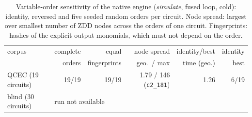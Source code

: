\begin{table}[t]
\centering\footnotesize
\caption{Variable-order sensitivity of the native engine (\emph{simulate}, fused loop, cold): identity, reversed and five seeded random orders per circuit. Node spread: largest over smallest number of ZDD nodes across the orders of one circuit. Fingerprints: hashes of the explicit output monomials, which must not depend on the order.}
\label{tab:order}
\begin{tabular}{lrrrrr}
\toprule
corpus & complete & equal & node spread & identity/best & identity \\
 & orders & fingerprints & geo.\ / max & time (geo.) & best \\
\midrule
QCEC (19 circuits) & 19/19 & 19/19 & 1.79 / 146 (\texttt{c2\_181}) & 1.26 & 6/19 \\
blind (30 circuits) & \multicolumn{5}{l}{run not available} \\
\bottomrule
\end{tabular}
\end{table}
